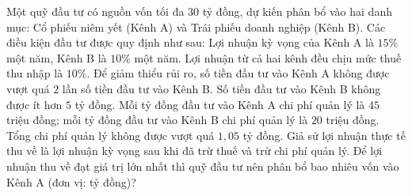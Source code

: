 \begin{ex}%
	Một quỹ đầu tư có nguồn vốn tối đa $30$ tỷ đồng, dự kiến phân bổ vào hai danh mục: Cổ phiếu niêm yết (Kênh A) và Trái phiếu doanh nghiệp (Kênh B). Các điều kiện đầu tư được quy định như sau: Lợi nhuận kỳ vọng của Kênh A là $15\%$ một năm, Kênh B là $10\%$ một năm. Lợi nhuận từ cả hai kênh đều chịu mức thuế thu nhập là $10\%$. Để giảm thiểu rủi ro, số tiền đầu tư vào Kênh A không được vượt quá $2$ lần số tiền đầu tư vào Kênh B. Số tiền đầu tư vào Kênh B không được ít hơn $5$ tỷ đồng. Mỗi tỷ đồng đầu tư vào Kênh A chi phí quản lý là $45$ triệu đồng; mỗi tỷ đồng đầu tư vào Kênh B chi phí quản lý là $20$ triệu đồng. Tổng chi phí quản lý không được vượt quá $1{,}05$ tỷ đồng. Giả sử lợi nhuận thực tế thu về là lợi nhuận kỳ vọng sau khi đã trừ thuế và trừ chi phí quản lý. Để lợi nhuận thu về đạt giá trị lớn nhất thì quỹ đầu tư nên phân bổ bao nhiêu vốn vào Kênh A (đơn vị: tỷ đồng)?
\end{ex}
